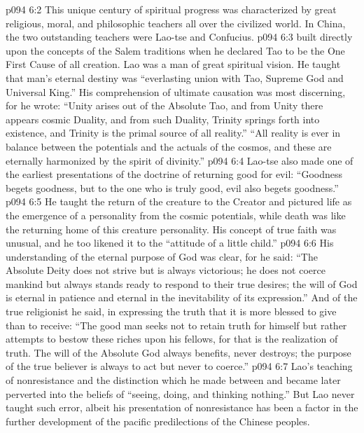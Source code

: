 \vs p094 6:2 This unique century of spiritual progress was characterized by great religious, moral, and philosophic teachers all over the civilized world. In China, the two outstanding teachers were Lao\hyp{}tse and Confucius.
\pc \vs p094 6:3  built directly upon the concepts of the Salem traditions when he declared Tao to be the One First Cause of all creation. Lao was a man of great spiritual vision. He taught that man’s eternal destiny was “everlasting union with Tao, Supreme God and Universal King.” His comprehension of ultimate causation was most discerning, for he wrote: “Unity arises out of the Absolute Tao, and from Unity there appears cosmic Duality, and from such Duality, Trinity springs forth into existence, and Trinity is the primal source of all reality.” “All reality is ever in balance between the potentials and the actuals of the cosmos, and these are eternally harmonized by the spirit of divinity.”
\vs p094 6:4 Lao\hyp{}tse also made one of the earliest presentations of the doctrine of returning good for evil: “Goodness begets goodness, but to the one who is truly good, evil also begets goodness.”
\vs p094 6:5 He taught the return of the creature to the Creator and pictured life as the emergence of a personality from the cosmic potentials, while death was like the returning home of this creature personality. His concept of true faith was unusual, and he too likened it to the “attitude of a little child.”
\vs p094 6:6 His understanding of the eternal purpose of God was clear, for he said: “The Absolute Deity does not strive but is always victorious; he does not coerce mankind but always stands ready to respond to their true desires; the will of God is eternal in patience and eternal in the inevitability of its expression.” And of the true religionist he said, in expressing the truth that it is more blessed to give than to receive: “The good man seeks not to retain truth for himself but rather attempts to bestow these riches upon his fellows, for that is the realization of truth. The will of the Absolute God always benefits, never destroys; the purpose of the true believer is always to act but never to coerce.”
\vs p094 6:7 Lao’s teaching of nonresistance and the distinction which he made between  and  became later perverted into the beliefs of “seeing, doing, and thinking nothing.” But Lao never taught such error, albeit his presentation of nonresistance has been a factor in the further development of the pacific predilections of the Chinese peoples.
